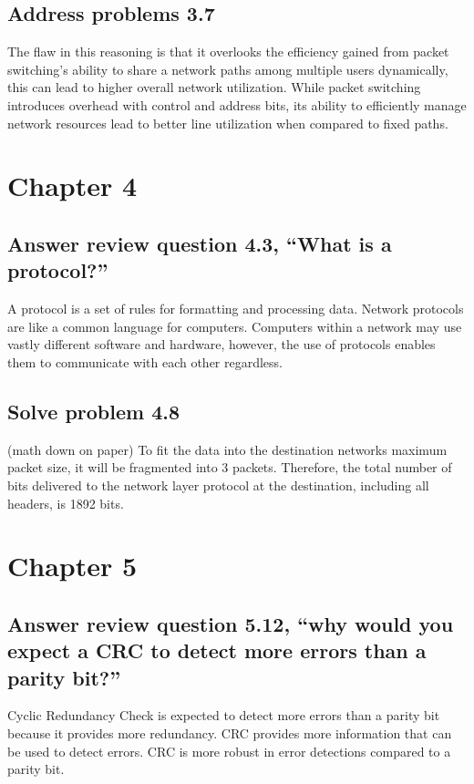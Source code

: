 \documentclass{article}
\begin{document}
\subsection{Address problems 3.7}
The flaw in this reasoning is that it overlooks the efficiency gained from packet switching’s ability to share a network paths among multiple users dynamically, this can lead to higher overall network utilization. While packet switching introduces overhead with control and address bits, its ability to efficiently manage network resources lead to better line utilization when compared to fixed paths.

\section{Chapter 4}
\subsection{Answer review question 4.3, “What is a protocol?”}
A protocol is a set of rules for formatting and processing data. Network protocols are like a common language for computers. Computers within a network may use vastly different software and hardware, however, the use of protocols enables them to communicate with each other regardless.

\subsection{Solve problem 4.8}
(math down on paper) To fit the data into the destination networks maximum packet size, it will be fragmented into 3 packets. Therefore, the total number of bits delivered to the network layer protocol at the destination, including all headers, is 1892 bits.

\section{Chapter 5}
\subsection{Answer review question 5.12, “why would you expect a CRC to detect more errors than a parity bit?”}
Cyclic Redundancy Check is expected to detect more errors than a parity bit because it provides more redundancy. CRC provides more information that can be used to detect errors. CRC is more robust in error detections compared to a parity bit.
\end{document}
